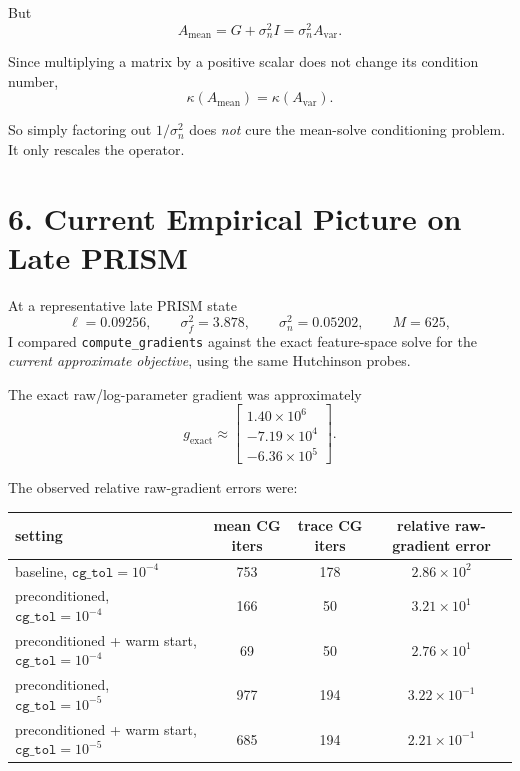 \documentclass[11pt]{article}
\begin{document}
But
\begin{equation}
A_{\mathrm{mean}} = G + \sigma_n^2 I = \sigma_n^2 A_{\mathrm{var}}.
\end{equation}

Since multiplying a matrix by a positive scalar does not change its condition
number,
\begin{equation}
\kappa(A_{\mathrm{mean}})
=
\kappa(A_{\mathrm{var}}).
\end{equation}

So simply factoring out $1/\sigma_n^2$ does \emph{not} cure the mean-solve
conditioning problem. It only rescales the operator.

\section*{6. Current Empirical Picture on Late PRISM}

At a representative late PRISM state
\begin{equation}
\ell = 0.09256,
\qquad
\sigma_f^2 = 3.878,
\qquad
\sigma_n^2 = 0.05202,
\qquad
M = 625,
\end{equation}
I compared \texttt{compute\_gradients} against the exact feature-space solve for
the \emph{current approximate objective}, using the same Hutchinson probes.

The exact raw/log-parameter gradient was approximately
\begin{equation}
g_{\mathrm{exact}}
\approx
\begin{bmatrix}
1.40 \times 10^6 \\
-7.19 \times 10^4 \\
-6.36 \times 10^5
\end{bmatrix}.
\end{equation}

The observed relative raw-gradient errors were:

\begin{center}
\begin{tabular}{lccc}
\toprule
setting & mean CG iters & trace CG iters & relative raw-gradient error \\
\midrule
baseline, $\texttt{cg\_tol}=10^{-4}$ & 753 & 178 & $2.86 \times 10^2$ \\
preconditioned, $\texttt{cg\_tol}=10^{-4}$ & 166 & 50 & $3.21 \times 10^1$ \\
preconditioned + warm start, $\texttt{cg\_tol}=10^{-4}$ & 69 & 50 & $2.76 \times 10^1$ \\
preconditioned, $\texttt{cg\_tol}=10^{-5}$ & 977 & 194 & $3.22 \times 10^{-1}$ \\
preconditioned + warm start, $\texttt{cg\_tol}=10^{-5}$ & 685 & 194 & $2.21 \times 10^{-1}$ \\
\bottomrule
\end{tabular}
\end{center}
\end{document}
